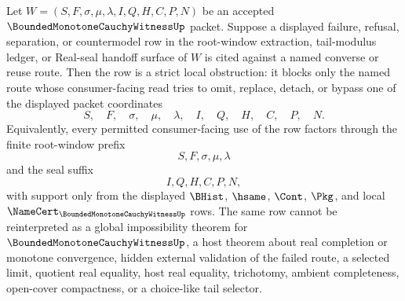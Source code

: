 \begin{corollary}
\label{cor:bounded-monotone-cauchy-witness-root-window-strict-obstruction}
Let $W=(S,F,\sigma,\mu,\lambda,I,Q,H,C,P,N)$ be an accepted $\BoundedMonotoneCauchyWitnessUp$ packet. Suppose a displayed failure, refusal, separation, or countermodel row in the root-window extraction, tail-modulus ledger, or Real-seal handoff surface of $W$ is cited against a named converse or reuse route. Then the row is a strict local obstruction: it blocks only the named route whose consumer-facing read tries to omit, replace, detach, or bypass one of the displayed packet coordinates
$$
S,\quad F,\quad \sigma,\quad \mu,\quad \lambda,\quad I,\quad Q,\quad H,\quad C,\quad P,\quad N.
$$
Equivalently, every permitted consumer-facing use of the row factors through the finite root-window prefix
$$
S,F,\sigma,\mu,\lambda
$$
and the seal suffix
$$
I,Q,H,C,P,N,
$$
with support only from the displayed $\BHist$, $\hsame$, $\Cont$, $\Pkg$, and local $\NameCert_{\BoundedMonotoneCauchyWitnessUp}$ rows. The same row cannot be reinterpreted as a global impossibility theorem for $\BoundedMonotoneCauchyWitnessUp$, a host theorem about real completion or monotone convergence, hidden external validation of the failed route, a selected limit, quotient real equality, host real equality, trichotomy, ambient completeness, open-cover compactness, or a choice-like tail selector.
\end{corollary}
